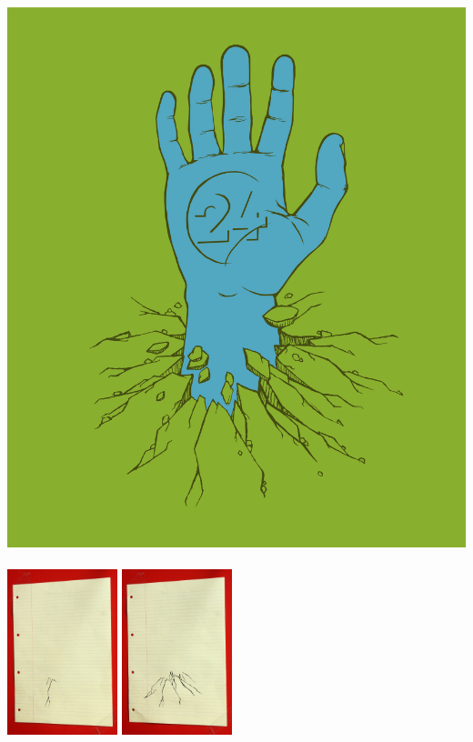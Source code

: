             \begin{center}           
                \includegraphics[width=\textwidth]{img/main.png}\\
                ~\\
                \includegraphics[width=0.24\textwidth]{img/IMG_5730.JPG}
                \includegraphics[width=0.24\textwidth]{img/IMG_5741.JPG}

\end{center}
